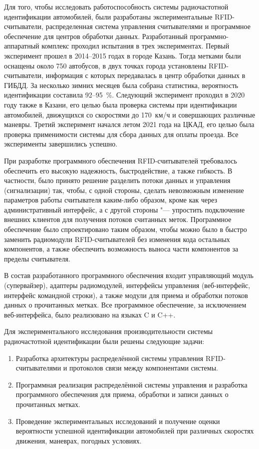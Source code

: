 Для того, чтобы исследовать работоспособность системы радиочастотной идентификации автомобилей, были разработаны экспериментальные RFID-считыватели, распределенная система управления считывателями и программное обеспечение для центров обработки данных. Разработанный программно-аппаратный комплекс проходил испытания в трех экспериментах. Первый эксперимент прошел в 2014--2015 годах в городе Казань. Тогда метками были оснащены около 750 автобусов, в двух точках города установлены RFID-считыватели, информация с которых передавалась в центр обработки данных в ГИБДД. За несколько зимних месяцев была собрана статистика, вероятность идентификации составила 92--95~\%. Следующий эксперимент проходил в 2020 году также в Казани, его целью была проверка системы при идентификации автомобилей, движущихся со скоростями до 170~км/ч и совершающих различные маневры. Третий эксперимент начался летом 2021 года на ЦКАД, его целью была проверка применимости системы для сбора данных для оплаты проезда. Все эксперименты завершились успешно.

При разработке программного обеспечения RFID-считывателей требовалось обеспечить его высокую надежность, быстродействие, а также гибкость. В частности, было принято решение разделить потоки данных и управления (сигнализации) так, чтобы, с одной стороны, сделать невозможным изменение параметров работы считывателя каким-либо образом, кроме как через административный интерфейс, а с другой стороны "--- упростить подключение внешних клиентов для получения потоков считанных меток. Программное обеспечение было спроектировано таким образом, чтобы можно было в быстро заменить радиомодули RFID-считывателей без изменения кода остальных компонентов, а также обеспечить возможность выноса части компонентов за пределы считывателя.

В состав разработанного программного обеспечения входит управляющий модуль (супервайзер), адаптеры радиомодулей, интерфейсы управления (веб-интерфейс, интерфейс командной строки), а также модули для приема и обработки потоков данных о прочитанных метках. Все программное обеспечение, за исключением веб-интерфейса, было реализовано на языках C и C++.

Для экспериментального исследования производительности системы радиочастотной идентификации были решены следующие задачи:

\begin{enumerate}
	\item Разработка архитектуры распределённой системы управления RFID-считывателями и протоколов связи между компонентами системы.
	\item Программная реализация распределённой системы управления и разработка программного обеспечения для приема, обработки и записи данных о прочитанных метках.
	\item Проведение экспериментальных исследований и получение оценки вероятности успешной идентификации автомобилей при различных скоростях движения, маневрах, погодных условиях.
\end{enumerate}

